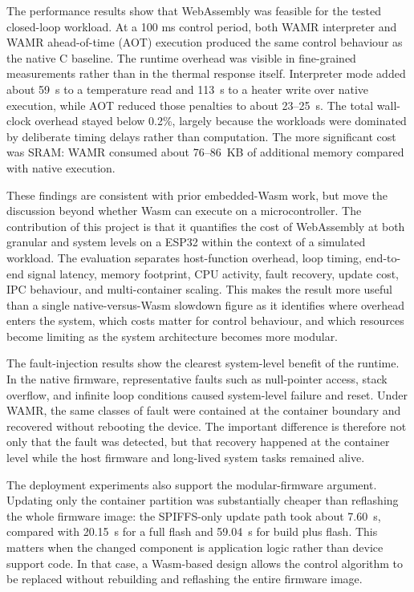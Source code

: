 \documentclass[12pt, a4paper]{report}
\begin{document}
The performance results show that WebAssembly was feasible for the tested closed-loop workload. At a 100 ms control period, both WAMR interpreter and WAMR ahead-of-time (AOT) execution produced the same control behaviour as the native C baseline. The runtime overhead was visible in fine-grained measurements rather than in the thermal response itself. Interpreter mode added about 59~\textmu{}s to a temperature read and 113~\textmu{}s to a heater write over native execution, while AOT reduced those penalties to about 23--25~\textmu{}s. The total wall-clock overhead stayed below 0.2\%, largely because the workloads were dominated by deliberate timing delays rather than computation. The more significant cost was SRAM: WAMR consumed about 76--86~KB of additional memory compared with native execution.

These findings are consistent with prior embedded-Wasm work, but move the discussion beyond whether Wasm can execute on a microcontroller. The contribution of this project is that it quantifies the cost of WebAssembly at both granular and system levels on a ESP32 within the context of a simulated workload. The evaluation separates host-function overhead, loop timing, end-to-end signal latency, memory footprint, CPU activity, fault recovery, update cost, IPC behaviour, and multi-container scaling. This makes the result more useful than a single native-versus-Wasm slowdown figure as it identifies where overhead enters the system, which costs matter for control behaviour, and which resources become limiting as the system architecture becomes more modular.

The fault-injection results show the clearest system-level benefit of the runtime. In the native firmware, representative faults such as null-pointer access, stack overflow, and infinite loop conditions caused system-level failure and reset. Under WAMR, the same classes of fault were contained at the container boundary and recovered without rebooting the device. The important difference is therefore not only that the fault was detected, but that recovery happened at the container level while the host firmware and long-lived system tasks remained alive.

The deployment experiments also support the modular-firmware argument. Updating only the container partition was substantially cheaper than reflashing the whole firmware image: the SPIFFS-only update path took about 7.60~s, compared with 20.15~s for a full flash and 59.04~s for build plus flash. This matters when the changed component is application logic rather than device support code. In that case, a Wasm-based design allows the control algorithm to be replaced without rebuilding and reflashing the entire firmware image.
\end{document}
